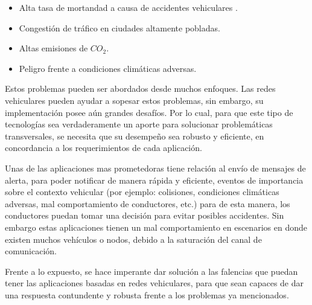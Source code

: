 \begin{itemize}
\item Alta tasa de mortandad a causa de accidentes vehiculares \cite{GSRRS}.
\item Congestión de tráfico en ciudades altamente pobladas.
\item Altas emisiones de $CO_2$.   
\item Peligro frente a condiciones climáticas adversas.
\end{itemize} 

Estos problemas pueden ser abordados desde muchos enfoques. Las redes vehiculares pueden ayudar a sopesar estos problemas, sin embargo, su implementación posee aún grandes desafíos. Por lo cual, para que este tipo de tecnologías sea verdaderamente un aporte para solucionar problemáticas transversales, se necesita que su desempeño sea robusto y eficiente, en concordancia a los requerimientos de cada aplicación. 

Unas de las aplicaciones mas prometedoras tiene relación al envío de mensajes de alerta, para poder notificar de manera rápida y eficiente, eventos de importancia sobre el contexto vehicular (por ejemplo: colisiones, condiciones climáticas adversas, mal comportamiento de conductores, etc.) para de esta manera, los conductores puedan tomar una decisión para evitar posibles accidentes. Sin embargo estas aplicaciones tienen un mal comportamiento en escenarios en donde existen muchos vehículos o nodos, debido a la saturación del canal de comunicación.

Frente a lo expuesto, se hace imperante dar solución a las falencias que puedan tener las aplicaciones basadas en redes vehiculares, para que sean capaces de dar una respuesta contundente y robusta frente a los problemas ya mencionados.

